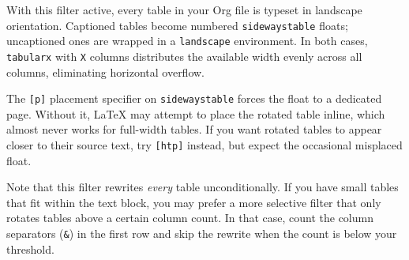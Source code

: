 \noindent
With this filter active, every table in your Org file is typeset in
landscape orientation.  Captioned tables become numbered
\texttt{sidewaystable} floats; uncaptioned ones are wrapped in a
\texttt{landscape} environment.  In both cases, \texttt{tabularx} with
\texttt{X} columns distributes the available width evenly across all
columns, eliminating horizontal overflow.

\begin{expertdepth}
The \texttt{[p]} placement specifier on \texttt{sidewaystable} forces
the float to a dedicated page.  Without it, \LaTeX{} may attempt to
place the rotated table inline, which almost never works for
full-width tables.  If you want rotated tables to appear closer to
their source text, try \texttt{[htp]} instead, but expect the
occasional misplaced float.

Note that this filter rewrites \emph{every} table unconditionally.
If you have small tables that fit within the text block, you may
prefer a more selective filter that only rotates tables above a
certain column count.  In that case, count the column separators
(\texttt{\&}) in the first row and skip the rewrite when the count is
below your threshold.
\end{expertdepth}

